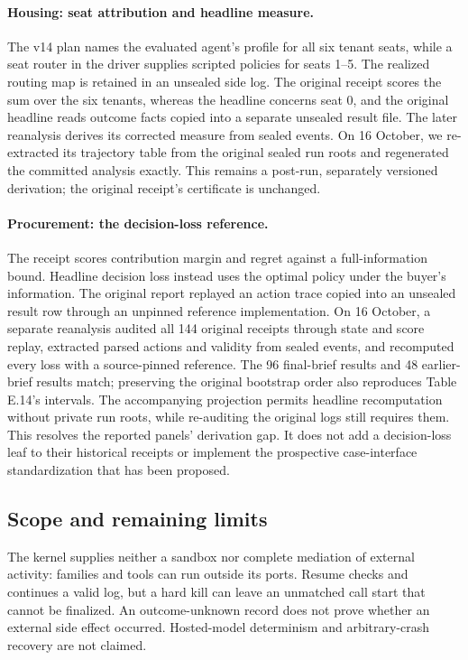 \paragraph{Housing: seat attribution and headline measure.}
The v14 plan names the evaluated agent's profile for all six tenant seats, while
a seat router in the driver supplies scripted policies for seats 1--5.
The realized routing map is retained in an unsealed side log.
The original receipt scores the sum over the six tenants, whereas the headline
concerns seat 0, and the original headline reads outcome facts
copied into a separate unsealed result file. The later
reanalysis derives its
corrected measure from sealed events. On 16 October, we re-extracted its trajectory table
from the original sealed run roots and regenerated the committed
analysis exactly. This remains a post-run, separately
versioned derivation; the original receipt's certificate is unchanged.

\paragraph{Procurement: the decision-loss reference.}
The receipt scores contribution margin and regret against a
full-information bound. Headline decision loss instead uses the optimal
policy under the buyer's information. The original report replayed an
action trace copied into an unsealed result row through an unpinned
reference implementation. On 16 October, a separate
reanalysis audited all 144 original receipts through
state and score replay, extracted parsed actions and validity from sealed
events, and recomputed every loss with a source-pinned reference. The 96
final-brief results and 48 earlier-brief results match; preserving the
original bootstrap order also reproduces Table E.14's intervals. The
accompanying projection permits headline recomputation without private
run roots, while re-auditing the original logs still requires them.
This resolves the reported panels' derivation gap. It does not add a
decision-loss leaf to their historical receipts or implement the
prospective case-interface standardization that has been proposed.

\subsection{Scope and remaining limits}
\label{app:runtime-limits}

The kernel supplies neither a sandbox nor complete mediation of external
activity: families and tools can run outside its ports. Resume checks and
continues a valid log, but a hard kill can leave an unmatched call start
that cannot be finalized. An outcome-unknown record does not prove
whether an external side effect occurred. Hosted-model determinism and
arbitrary-crash recovery are not claimed.

